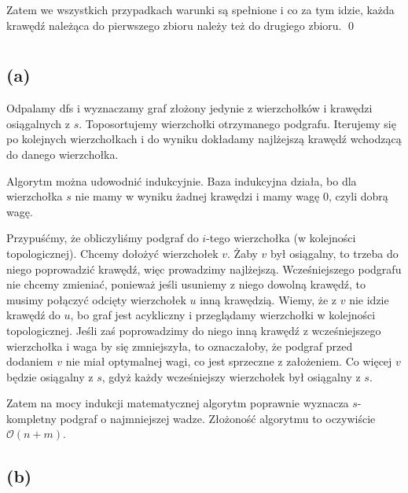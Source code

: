\documentclass[11pt]{article}
\begin{document}
Zatem we wszystkich przypadkach warunki są spełnione i co za tym idzie, każda
krawędź należąca do pierwszego zbioru należy też do drugiego zbioru.
\qed

\section{}

\subsection*{(a)}

Odpalamy dfs i wyznaczamy graf złożony jedynie z wierzchołków i krawędzi
osiągalnych z $s$. Toposortujemy wierzchołki otrzymanego podgrafu.
Iterujemy się po kolejnych wierzchołkach i do wyniku dokładamy najlżejszą
krawędź wchodzącą do danego wierzchołka.

Algorytm można udowodnić indukcyjnie. Baza indukcyjna działa, bo dla
wierzchołka $s$ nie mamy w wyniku żadnej krawędzi i mamy wagę $0$, czyli dobrą
wagę.

Przypuśćmy, że obliczyliśmy podgraf do $i$-tego wierzchołka (w kolejności
topologicznej). Chcemy dołożyć wierzchołek $v$. Żaby $v$ był osiągalny, to
trzeba do niego poprowadzić krawędź, więc prowadzimy najlżejszą. Wcześniejszego
podgrafu nie chcemy zmieniać, ponieważ jeśli usuniemy z niego dowolną krawędź,
to musimy połączyć odcięty wierzchołek $u$ inną krawędzią. Wiemy, że z $v$ nie
idzie krawędź do $u$, bo graf jest acykliczny i przeglądamy wierzchołki w
kolejności topologicznej. Jeśli zaś poprowadzimy do niego inną krawędź z
wcześniejszego wierzchołka i waga by się zmniejszyła, to oznaczałoby, że
podgraf przed dodaniem $v$ nie miał optymalnej wagi, co jest sprzeczne z
założeniem. Co więcej $v$ będzie osiągalny z $s$, gdyż każdy wcześniejszy
wierzchołek był osiągalny z $s$.

Zatem na mocy indukcji matematycznej algorytm poprawnie wyznacza $s$-kompletny
podgraf o najmniejszej wadze. Złożoność algorytmu to oczywiście
$\mathcal{O}(n+m)$.

\subsection*{(b)}

\section{}
\end{document}

